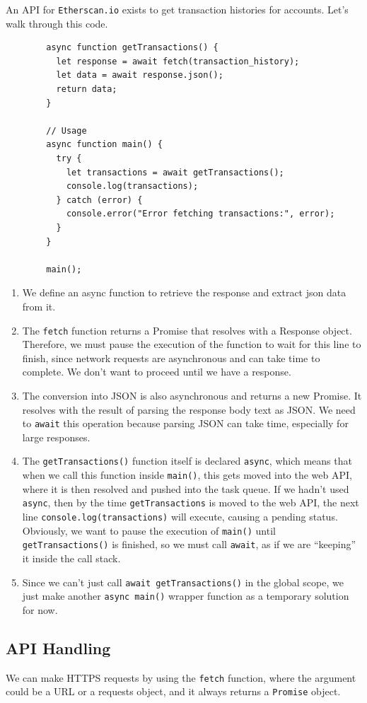 \documentclass{article}
\newcounter{example}[section]
\newcounter{code}[section]
\begin{document}
    \begin{example}
      \label{ex:fetching-ethereum-transactions}
      An API for \texttt{Etherscan.io} exists to get transaction histories for accounts. Let's walk through this code. 
      \begin{lstlisting}
        async function getTransactions() {
          let response = await fetch(transaction_history);
          let data = await response.json(); 
          return data;
        }

        // Usage
        async function main() {
          try {
            let transactions = await getTransactions();
            console.log(transactions);
          } catch (error) {
            console.error("Error fetching transactions:", error);
          }
        }

        main();
      \end{lstlisting}
      \begin{enumerate}
        \item We define an async function to retrieve the response and extract json data from it. 
        \item The \texttt{fetch} function returns a Promise that resolves with a Response object. Therefore, we must pause the execution of the function to wait for this line to finish, since network requests are asynchronous and can take time to complete. We don't want to proceed until we have a response. 
        \item The conversion into JSON is also asynchronous and returns a new Promise. It resolves with the result of parsing the response body text as JSON. We need to \texttt{await} this operation because parsing JSON can take time, especially for large responses. 
        \item The \texttt{getTransactions()} function itself is declared \texttt{async}, which means that when we call this function inside \texttt{main()}, this gets moved into the web API, where it is then resolved and pushed into the task queue. If we hadn't used \texttt{async}, then by the time \texttt{getTransactions} is moved to the web API, the next line \texttt{console.log(transactions)} will execute, causing a pending status. Obviously, we want to pause the execution of \texttt{main()} until \texttt{getTransactions()} is finished, so we must call \texttt{await}, as if we are ``keeping'' it inside the call stack. 

        \item Since we can't just call \texttt{await getTransactions()} in the global scope, we just make another \texttt{async main()} wrapper function as a temporary solution for now. 
      \end{enumerate}
    \end{example}

  \subsection{API Handling} 

    We can make HTTPS requests by using the \texttt{fetch} function, where the argument could be a URL or a requests object, and it always returns a \texttt{Promise} object. 
\end{document}
